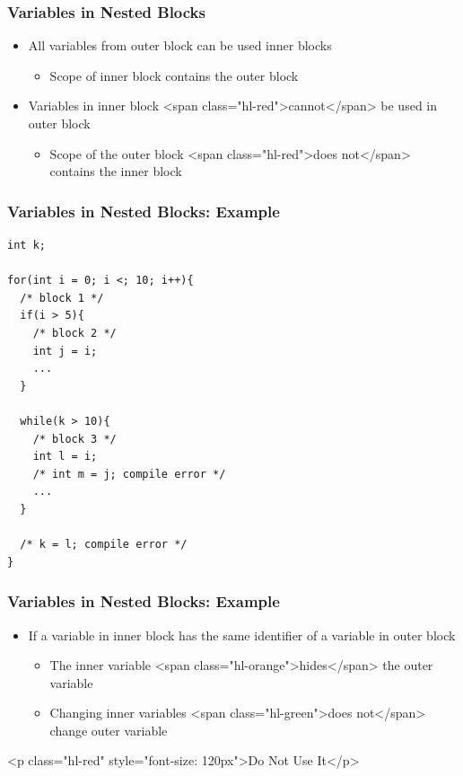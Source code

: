 \documentclass{../c-lecture}
\begin{document}
\begin{frame}
  \frametitle{Variables in Nested Blocks}
  \begin{itemize}
    \item All variables from outer block can be used inner blocks
    \begin{itemize}
      \item Scope of inner block contains the outer block
    \end{itemize}
    \item
      Variables in inner block <span class="hl-red">cannot</span> be used in
      outer block

    \begin{itemize}
      \item
        Scope of the outer block
        <span class="hl-red">does not</span> contains the inner block

    \end{itemize}
  \end{itemize}
\end{frame}

\begin{frame}[fragile]
  \frametitle{Variables in Nested Blocks: Example}
  \begin{verbatim}
int k;

for(int i = 0; i <; 10; i++){
  /* block 1 */
  if(i > 5){
    /* block 2 */
    int j = i;
    ...
  }

  while(k > 10){
    /* block 3 */
    int l = i;
    /* int m = j; compile error */
    ...
  }

  /* k = l; compile error */
}
  \end{verbatim}
\end{frame}

\begin{frame}
  \frametitle{Variables in Nested Blocks: Example}
  \begin{itemize}
    \item
      If a variable in inner block has the same identifier of a variable in
      outer block

    \begin{itemize}
      \item
        The inner variable <span class="hl-orange">hides</span> the outer
        variable

      \item
        Changing inner variables
        <span class="hl-green">does not</span> change outer variable

    \end{itemize}
  \end{itemize}
  <p class="hl-red" style="font-size: 120px">Do Not Use It</p>
\end{frame}
\end{document}
